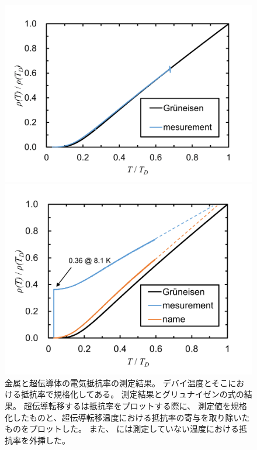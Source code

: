 \documentclass[11pt,dvipdfmx,a4paper]{jsarticle}
\begin{document}
\begin{figure}
    \centering
    \begin{minipage}[t]{0.48\columnwidth}
        \centering
        \includegraphics[width=\columnwidth]{graph/graph02.png}
    \end{minipage}
    \hfill
    \begin{minipage}[t]{0.48\columnwidth}
        \centering
        \includegraphics[width=\columnwidth]{graph/graph03.png} %
    \end{minipage}
    \caption{金属と超伝導体の電気抵抗率の測定結果。
    デバイ温度とそこにおける抵抗率で規格化してある。
    測定結果とグリュナイゼンの式の結果。
    超伝導転移するは抵抗率をプロットする際に、
    測定値を規格化したものと、超伝導転移温度における抵抗率の寄与を取り除いたものをプロットした。
    また、 には測定していない温度における抵抗率を外挿した。}
\end{figure}
\end{document}
